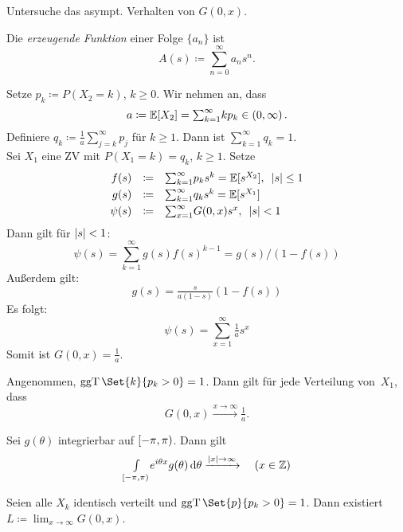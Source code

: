 \documentclass{cheat-sheet}
\newcommand{\E}{\mathbb{E}} %
\DeclareMathOperator{\ggT}{ggT} %
\begin{document}
\begin{ziel}
  Untersuche das asympt. Verhalten von $G(0, x)$.
\end{ziel}

\begin{defn}
  Die \emph{erzeugende Funktion} einer Folge $\{ a_n \}$ ist
  \[ A(s) \coloneqq \sum_{n=0}^\infty a_n s^n. \]
\end{defn}

\begin{bsp}
  Setze $p_k \coloneqq P(X_2 = k)$, $k \geq 0$.
  Wir nehmen an, dass
  \[ a \coloneqq \E[X_2] = {\sum}_{k=1}^\infty k p_k \in \ointerval{0}{\infty}. \]
  Definiere
  $q_k \coloneqq \tfrac{1}{a} {\sum}_{j=k}^\infty p_j$
  für $k \geq 1$.
  Dann ist ${\sum}_{k=1}^\infty q_k = 1$. \\
  Sei $X_1$ eine ZV mit $P(X_1=k) = q_k$, $k \geq 1$.
  Setze
  \[
    \begin{array}{r c l}
      f(s) &\coloneqq& {\sum}_{k=1}^\infty p_k s^k = \E[s^{X_2}], \enspace \abs{s} \leq 1 \\[0.1cm]
      g(s) &\coloneqq& {\sum}_{k=1}^\infty q_k s^k = \E[s^{X_1}] \\[0.1cm]
      \psi(s) &\coloneqq& {\sum}_{x=1}^\infty G(0, x) s^x, \enspace \abs{s} < 1
    \end{array}
  \]
  Dann gilt für $\lvert s\rvert < 1$:
  \[ \psi(s) = {\sum}_{k=1}^\infty g(s) f(s)^{k-1} = g(s)/(1 - f(s)) \]
  Außerdem gilt:
  \[ g(s) = \tfrac{s}{a (1-s)} (1 - f(s)) \]
  Es folgt:
  \[ \psi(s) = \sum_{x=1}^\infty \tfrac{1}{a} s^x \]
  Somit ist $G(0, x) = \tfrac{1}{a}$.
\end{bsp}

\begin{satz}
  Angenommen, $\ggT \Set{k}{p_k > 0} = 1$.
  Dann gilt für jede Verteilung von~$X_1$, dass
  \[ G(0, x) \xrightarrow{x \to \infty} \tfrac{1}{a}. \]
\end{satz}

\begin{lem}
  Sei $g(\theta)$ integrierbar auf $\left[ -\pi, \pi \right)$.
  Dann gilt
  \[
    {\textstyle \int\limits_{\left[ -\pi, \pi \right)}^{}} e^{i \theta x} g(\theta) \,\mathrm{d} \theta \xrightarrow{\lvert x\rvert \to \infty}
    \quad (x \in \mathbb{Z})
  \]
\end{lem}

\begin{lem}
  \begin{minipage}[t]{0.8 \linewidth}
    Seien alle $X_k$ identisch verteilt und $\ggT \Set{p}{p_k > 0} = 1$.
    Dann existiert $L \coloneqq {\lim}_{x \to \infty} G(0, x)$.
  \end{minipage}
\end{lem}
\end{document}
